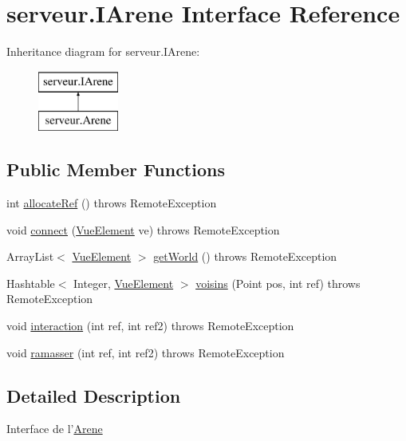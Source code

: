 \hypertarget{interfaceserveur_1_1_i_arene}{\section{serveur.\-I\-Arene Interface Reference}
\label{interfaceserveur_1_1_i_arene}
}
Inheritance diagram for serveur.\-I\-Arene\-:\begin{figure}[H]
\begin{center}
\leavevmode
\includegraphics[height=2.000000cm]{interfaceserveur_1_1_i_arene}
\end{center}
\end{figure}
\subsection*{Public Member Functions}
\begin{DoxyCompactItemize}
\item 
int \hyperlink{interfaceserveur_1_1_i_arene_a6dc6a07ca0fdb5c2fd1ba53edd132298}{allocate\-Ref} ()  throws Remote\-Exception
\item 
void \hyperlink{interfaceserveur_1_1_i_arene_a5a051d16e51b7a0f368c4f89401a0293}{connect} (\hyperlink{classinterface_graphique_1_1_vue_element}{Vue\-Element} ve)  throws Remote\-Exception
\item 
Array\-List$<$ \hyperlink{classinterface_graphique_1_1_vue_element}{Vue\-Element} $>$ \hyperlink{interfaceserveur_1_1_i_arene_ab7ea50f885f2cf28628d1c7ce2ca0159}{get\-World} ()  throws Remote\-Exception
\item 
Hashtable$<$ Integer, \hyperlink{classinterface_graphique_1_1_vue_element}{Vue\-Element} $>$ \hyperlink{interfaceserveur_1_1_i_arene_a47a37dbadfd6418b184e2c9f41faec01}{voisins} (Point pos, int ref)  throws Remote\-Exception
\item 
void \hyperlink{interfaceserveur_1_1_i_arene_aec66c3ded2467e80685b8cb4cf856cbc}{interaction} (int ref, int ref2)  throws Remote\-Exception
\item 
void \hyperlink{interfaceserveur_1_1_i_arene_adc0a9a0ec4b423e5b6a13a90091ead8c}{ramasser} (int ref, int ref2)  throws Remote\-Exception
\end{DoxyCompactItemize}


\subsection{Detailed Description}
Interface de l'\hyperlink{classserveur_1_1_arene}{Arene} 

